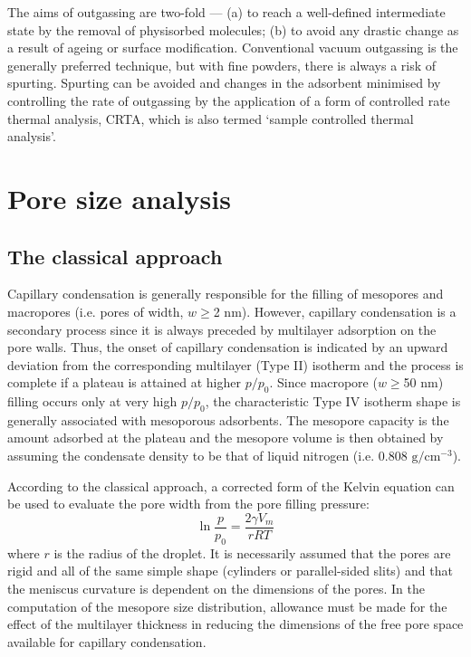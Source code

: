 \documentclass[%
 reprint,
 amsmath,amssymb,
 aps,
10.5pt,
]{revtex4-1}
\begin{document}
The aims of outgassing are two-fold —
(a) to reach a well-defined intermediate state by
the removal of physisorbed molecules; (b) to
avoid any drastic change as a result of ageing
or surface modification. Conventional vacuum
outgassing is the generally preferred technique,
but with fine powders, there is always a risk of
spurting. Spurting can be avoided and changes
in the adsorbent minimised by controlling the
rate of outgassing by the application of a form
of controlled rate thermal analysis, CRTA,
which is also termed `sample controlled thermal
analysis'.

\section{Pore size analysis}
\subsection{The classical approach}
Capillary condensation is generally responsible
for the filling of mesopores and macropores (i.e.
pores of width, $w\geq$2 nm). However, capillary
condensation is a secondary process since it is
always preceded by multilayer adsorption on the
pore walls. Thus, the onset of capillary
condensation is indicated by an upward
deviation from the corresponding multilayer
(Type II) isotherm and the process is complete
if a plateau is attained at higher $p/p_0$. Since
macropore ($w \geq$50 nm) filling occurs only at
very high $p/p_0$, the characteristic Type IV
isotherm shape is generally associated with
mesoporous adsorbents. The mesopore capacity
is the amount adsorbed at the plateau and the
mesopore volume is then obtained by assuming
the condensate density to be that of liquid
nitrogen (i.e. 0.808 $\mathrm{g/cm^{-3}}$).

According to the classical approach, a
corrected form of the Kelvin equation can be
used to evaluate the pore width from the pore
filling pressure:
\begin{equation}
 	\ln{\frac{p}{p_0}} = \frac{2\gamma V_m}{rRT}
 \end{equation}
  where $r$ is the radius of the droplet. 
  It is necessarily assumed that the
pores are rigid and all of the same simple shape
(cylinders or parallel-sided slits) and that the
meniscus curvature is dependent on the
dimensions of the pores. In the computation of
the mesopore size distribution, allowance must
be made for the effect of the multilayer
thickness in reducing the dimensions of the free
pore space available for capillary condensation.
\end{document}

